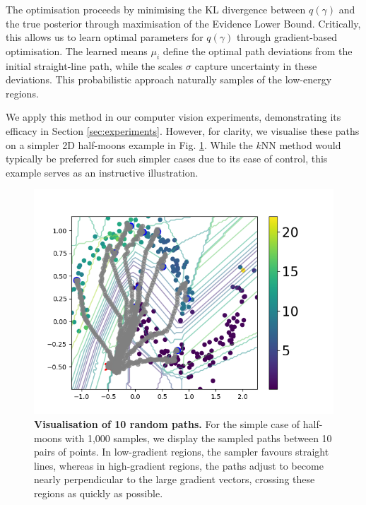 The optimisation proceeds by minimising the KL divergence between $q(\gamma)$ and the true posterior through maximisation of the Evidence Lower Bound. Critically, this allows us to learn optimal parameters for $q(\gamma)$ through gradient-based optimisation. The learned means $\mu_i$ define the optimal path deviations from the initial straight-line path, while the scales $\sigma$ capture uncertainty in these deviations. This probabilistic approach naturally samples of the low-energy regions.

We apply this method in our computer vision experiments, demonstrating its efficacy in Section \ref{sec:experiments}. However, for clarity, we visualise these paths on a simpler 2D half-moons example in Fig. \ref{fig:svi_moons}. While the $k$NN method would typically be preferred for such simpler cases due to its ease of control, this example serves as an instructive illustration.

\begin{figure}[ht]
	\vskip 0.2in
	\begin{center}
		\centerline{\includegraphics[width=\columnwidth]{figures/svi_ig_moons.png}}
		\caption{\textbf{Visualisation of 10 random paths.} For the simple case of half-moons with 1,000 samples, we display the sampled paths between 10 pairs of points. In low-gradient regions, the sampler favours straight lines, whereas in high-gradient regions, the paths adjust to become nearly perpendicular to the large gradient vectors, crossing these regions as quickly as possible.}
		\label{fig:svi_moons}
	\end{center}
	\vskip -0.2in
\end{figure}

